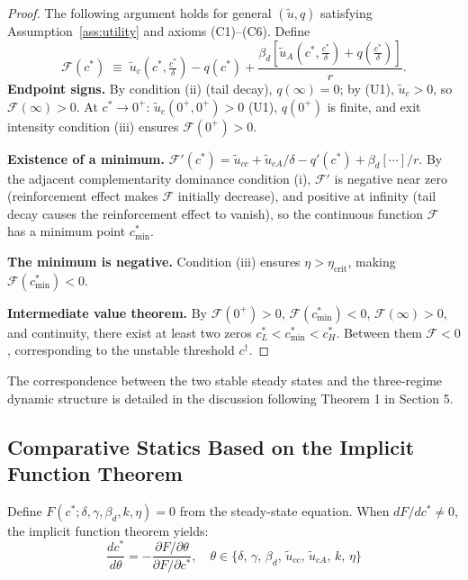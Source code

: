 \documentclass[12pt]{article}
\begin{document}
\begin{proof}
The following argument holds for general $(\tilde{u}, q)$ satisfying Assumption~\ref{ass:utility} and axioms (C1)--(C6). Define
\[
    \mathcal{F}(c^*) \;\equiv\;
    \tilde{u}_c\!\left(c^*, \tfrac{c^*}{\delta}\right)
    - q(c^*)
    + \frac{\beta_d\!\left[\tilde{u}_A\!\left(c^*,\tfrac{c^*}{\delta}\right)
    + q\!\left(\tfrac{c^*}{\delta}\right)\right]}{r}.
\]
\textbf{Endpoint signs.}
By condition (ii) (tail decay), $q(\infty)=0$; by (U1), $\tilde{u}_c>0$, so
$\mathcal{F}(\infty) > 0$.
At $c^*\to 0^+$: $\tilde{u}_c(0^+, 0^+) > 0$ (U1),
$q(0^+)$ is finite, and exit intensity condition (iii) ensures $\mathcal{F}(0^+) > 0$.
 
\textbf{Existence of a minimum.}
$\mathcal{F}'(c^*) = \tilde{u}_{cc} + \tilde{u}_{cA}/\delta
- q'(c^*) + \beta_d[\cdots]/r$.
By the adjacent complementarity dominance condition (i), $\mathcal{F}'$ is negative near zero (reinforcement effect makes
$\mathcal{F}$ initially decrease), and positive at infinity (tail decay causes the reinforcement effect to vanish),
so the continuous function $\mathcal{F}$ has a minimum point $c^*_{\min}$.
 
\textbf{The minimum is negative.}
Condition (iii) ensures $\eta > \eta_{\mathrm{crit}}$, making
$\mathcal{F}(c^*_{\min}) < 0$.
 
\textbf{Intermediate value theorem.}
By $\mathcal{F}(0^+)>0$, $\mathcal{F}(c^*_{\min})<0$,
$\mathcal{F}(\infty)>0$, and continuity, there exist at least two zeros
$c^*_L < c^*_{\min} < c^*_H$. Between them $\mathcal{F}<0$,
corresponding to the unstable threshold $c^\dagger$.
\end{proof}

The correspondence between the two stable steady states and the three-regime dynamic structure is detailed in the discussion following Theorem 1 in Section 5.

\subsection{Comparative Statics Based on the Implicit Function Theorem}

Define $F(c^*; \delta, \gamma, \beta_d, k, \eta) = 0$ from the steady-state equation. When $dF/dc^* \neq 0$,
the implicit function theorem yields:
\begin{equation}\label{eq:comparative}
\frac{dc^*}{d\theta} = -\frac{\partial F/\partial\theta}{\partial F/\partial c^*},
\quad\theta \in \{\delta,\, \gamma,\, \beta_d,\, \tilde{u}_{cc},\,
\tilde{u}_{cA},\, k,\, \eta\}
\end{equation}
\end{document}

